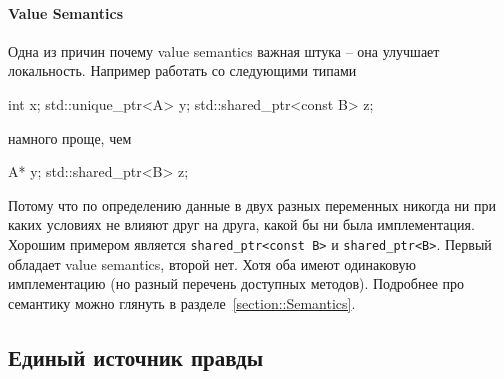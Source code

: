 \paragraph{Value Semantics}

Одна из причин почему value semantics важная штука -- она улучшает локальность.
Например работать со следующими типами
\begin{cppcode}
int x;
std::unique_ptr<A> y;
std::shared_ptr<const B> z;
\end{cppcode}
намного проще, чем
\begin{cppcode}
A* y;
std::shared_ptr<B> z;
\end{cppcode}
Потому что по определению данные в двух разных переменных никогда ни при каких условиях не влияют друг на друга, какой бы ни была имплементация.
Хорошим примером является \verb"shared_ptr<const B>" и \verb"shared_ptr<B>".
Первый обладает value semantics, второй нет.
Хотя оба имеют одинаковую имплементацию (но разный перечень доступных методов).
Подробнее про семантику можно глянуть в разделе~\ref{section::Semantics}.

\subsection{Единый источник правды}
\label{section::UniqueTruth}

